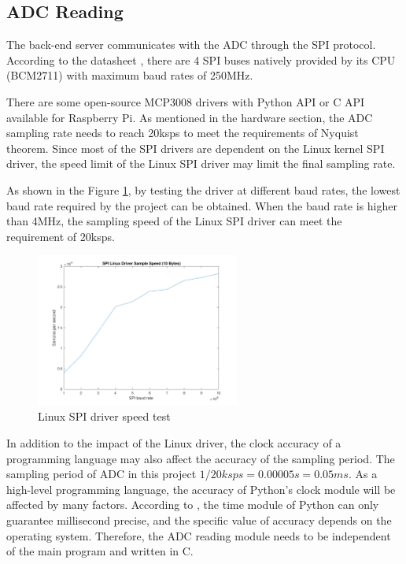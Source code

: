 \subsection{ADC Reading}
The back-end server communicates with the ADC through the SPI protocol. According to the datasheet  \textcite{raspberrypi}, there are 4 SPI buses natively provided by its CPU (BCM2711) with maximum baud rates of 250MHz. 
\par
There are some open-source MCP3008 drivers with Python API or C API available for Raspberry Pi. As mentioned in the hardware section, the ADC sampling rate needs to reach 20ksps to meet the requirements of Nyquist theorem. Since most of the SPI drivers are dependent on the Linux kernel SPI driver, the speed limit of the Linux SPI driver may limit the final sampling rate.
\par
As shown in the Figure \ref{fig:spi}, by testing the driver at different baud rates, the lowest baud rate required by the project can be obtained. When the baud rate is higher than 4MHz, the sampling speed of the Linux SPI driver can meet the requirement of 20ksps.
\begin{figure}[H]
    \centering
    \includegraphics[width=0.6\textwidth]{figure/spi_linux.pdf}
    \caption{Linux SPI driver speed test}
    \label{fig:spi}
\end{figure}
In addition to the impact of the Linux driver, the clock accuracy of a programming language may also affect the accuracy of the sampling period. The sampling period of ADC in this project $ 1/20ksps=0.00005s=0.05ms$. As a high-level programming language, the accuracy of Python’s clock module will be affected by many factors. According to \textcite{python}, the time module of Python can only guarantee millisecond precise, and the specific value of accuracy depends on the operating system. Therefore, the ADC reading module needs to be independent of the main program and written in C.
\par
